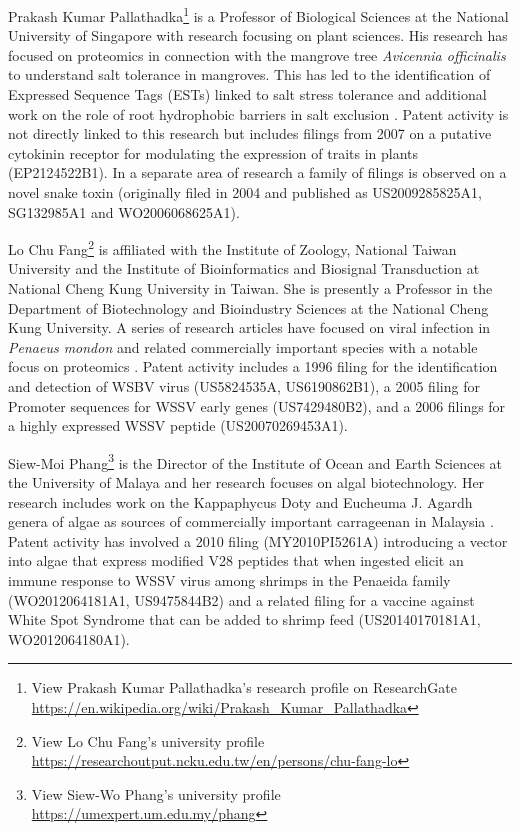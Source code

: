 \documentclass[openany]{book}
\let\rmarkdownfootnote\footnote%
\def\footnote{\protect\rmarkdownfootnote}
\theoremstyle{definition}
\theoremstyle{definition}
\theoremstyle{definition}
\theoremstyle{remark}
\begin{document}
Prakash Kumar Pallathadka\footnote{View Prakash Kumar Pallathadka's
  research profile on ResearchGate
  \url{https://en.wikipedia.org/wiki/Prakash_Kumar_Pallathadka}} is a
Professor of Biological Sciences at the National University of Singapore
with research focusing on plant sciences. His research has focused on
proteomics in connection with the mangrove tree \emph{Avicennia
officinalis} to understand salt tolerance in mangroves. This has led to
the identification of Expressed Sequence Tags (ESTs) linked to salt
stress tolerance and additional work on the role of root hydrophobic
barriers in salt exclusion
\citep{Krishnamurthy_2014, Jyothi_Prakash_2014, Krishnamurthy_2014a}.
Patent activity is not directly linked to this research but includes
filings from 2007 on a putative cytokinin receptor for modulating the
expression of traits in plants (EP2124522B1). In a separate area of
research a family of filings is observed on a novel snake toxin
(originally filed in 2004 and published as US2009285825A1, SG132985A1
and WO2006068625A1).

Lo Chu Fang\footnote{View Lo Chu Fang's university profile
  \url{https://researchoutput.ncku.edu.tw/en/persons/chu-fang-lo}} is
affiliated with the Institute of Zoology, National Taiwan University and
the Institute of Bioinformatics and Biosignal Transduction at National
Cheng Kung University in Taiwan. She is presently a Professor in the
Department of Biotechnology and Bioindustry Sciences at the National
Cheng Kung University. A series of research articles have focused on
viral infection in \emph{Penaeus mondon} and related commercially
important species with a notable focus on proteomics
\citep{Suraprasit_2014, Rattanarojpong_2007, Gonnet_2008}. Patent
activity includes a 1996 filing for the identification and detection of
WSBV virus (US5824535A, US6190862B1), a 2005 filing for Promoter
sequences for WSSV early genes (US7429480B2), and a 2006 filings for a
highly expressed WSSV peptide (US20070269453A1).

Siew-Moi Phang\footnote{View Siew-Wo Phang's university profile
  \url{https://umexpert.um.edu.my/phang}} is the Director of the
Institute of Ocean and Earth Sciences at the University of Malaya and
her research focuses on algal biotechnology. Her research includes work
on the Kappaphycus Doty and Eucheuma J. Agardh genera of algae as
sources of commercially important carrageenan in Malaysia
\citep{Tan_2012}. Patent activity has involved a 2010 filing
(MY2010PI5261A) introducing a vector into algae that express modified
V28 peptides that when ingested elicit an immune response to WSSV virus
among shrimps in the Penaeida family (WO2012064181A1, US9475844B2) and a
related filing for a vaccine against White Spot Syndrome that can be
added to shrimp feed (US20140170181A1, WO2012064180A1).
\end{document}
